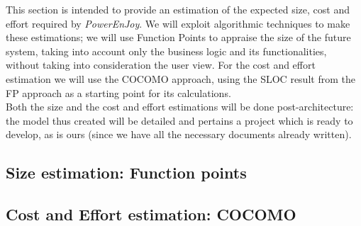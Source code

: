 This section is intended to provide an estimation of the expected size, cost and effort required by \textit{PowerEnJoy}. We will exploit algorithmic techniques to make these estimations; we will use Function Points to appraise the size of the future system, taking into account only the business logic and its functionalities, without taking into consideration the user view. For the cost and effort estimation we will use the COCOMO approach, using the SLOC result from the FP approach as a starting point for its calculations.\\
Both the size and the cost and effort estimations will be done post-architecture: the model thus created will be detailed and pertains a project which is ready to develop, as is ours (since we have all the necessary documents already written).

\subsection{Size estimation: Function points}
	

\subsection{Cost and Effort estimation: COCOMO}
	